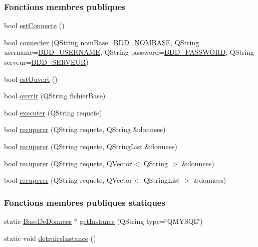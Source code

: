 \subsubsection*{Fonctions membres publiques}
\begin{DoxyCompactItemize}
\item 
bool \hyperlink{class_base_de_donnees_a00388973f3ec42e5c8e76e7af7e124b2}{est\+Connecte} ()
\item 
bool \hyperlink{class_base_de_donnees_ac20da193923a9bfea5e38ee5a54820cd}{connecter} (Q\+String nom\+Base=\hyperlink{parametres_8h_a45f8f15b8f9a7ab4c2b219038ff64f6b}{B\+D\+D\+\_\+\+N\+O\+M\+B\+A\+SE}, Q\+String username=\hyperlink{parametres_8h_a88b5f5b81fa534553c68802384beff2c}{B\+D\+D\+\_\+\+U\+S\+E\+R\+N\+A\+ME}, Q\+String password=\hyperlink{parametres_8h_ae2ded9166ed2553182545e97514c04f7}{B\+D\+D\+\_\+\+P\+A\+S\+S\+W\+O\+RD}, Q\+String serveur=\hyperlink{parametres_8h_a423559dc987673b8aacaa9f369839bb0}{B\+D\+D\+\_\+\+S\+E\+R\+V\+E\+UR})
\item 
bool \hyperlink{class_base_de_donnees_af9ac332082ffd0dd35e412cefabe5e9c}{est\+Ouvert} ()
\item 
bool \hyperlink{class_base_de_donnees_a7f6a5510b08017b0d99115a84252f186}{ouvrir} (Q\+String fichier\+Base)
\item 
bool \hyperlink{class_base_de_donnees_aa8de5f8f8bb17edc43f5c0ee33712081}{executer} (Q\+String requete)
\item 
bool \hyperlink{class_base_de_donnees_a77539baad389f5acf754cd2cd452403e}{recuperer} (Q\+String requete, Q\+String \&donnees)
\item 
bool \hyperlink{class_base_de_donnees_a2a5c461fa11d404810ae3ebe035d5190}{recuperer} (Q\+String requete, Q\+String\+List \&donnees)
\item 
bool \hyperlink{class_base_de_donnees_af9a76eb2b12df784280c379a4b22af62}{recuperer} (Q\+String requete, Q\+Vector$<$ Q\+String $>$ \&donnees)
\item 
bool \hyperlink{class_base_de_donnees_a68dd0d62ba03b9e8e5aa759d0666cb59}{recuperer} (Q\+String requete, Q\+Vector$<$ Q\+String\+List $>$ \&donnees)
\end{DoxyCompactItemize}
\subsubsection*{Fonctions membres publiques statiques}
\begin{DoxyCompactItemize}
\item 
static \hyperlink{class_base_de_donnees}{Base\+De\+Donnees} $\ast$ \hyperlink{class_base_de_donnees_a80028aa2b6b4fbf30fb2e36357b7d3d3}{get\+Instance} (Q\+String type=\char`\"{}Q\+M\+Y\+S\+QL\char`\"{})
\item 
static void \hyperlink{class_base_de_donnees_a457401c0816b888c77ce915997545f4e}{detruire\+Instance} ()
\end{DoxyCompactItemize}
